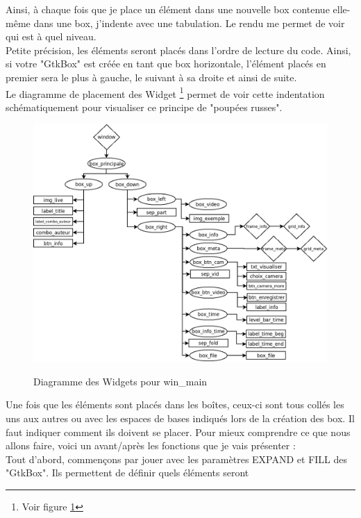\documentclass[11pt,french,a4paper]{report}
\begin{document}
Ainsi, à chaque fois que je place un élément dans une nouvelle box contenue elle-même dans une box, j'indente avec une 
tabulation. Le rendu me permet de voir qui est à quel niveau. \\
Petite précision, les éléments seront placés dans l'ordre de lecture du code. Ainsi, si votre "GtkBox" est créée en tant
que box horizontale, l'élément placés en premier sera le plus à gauche, le suivant à sa droite et ainsi de suite. \\ 
Le diagramme de placement des Widget \footnote{Voir figure \ref{org_win_main}} permet de voir cette 
indentation schématiquement pour visualiser ce principe de "poupées russes".
\begin{figure}[!h]
\centering
\includegraphics[scale=0.5]{../images/dia/diagramme_fenetre.png} \\
        \caption{Diagramme des Widgets pour win\_main}
        \label{org_win_main}
\end{figure}
Une fois que les éléments sont placés dans les boîtes, ceux-ci sont tous collés les uns aux autres ou avec 
les espaces de bases indiqués lors de la création des box. %
Il faut indiquer comment ils doivent se placer. Pour mieux comprendre ce que nous allons faire, voici un 
avant/après les fonctions que je vais présenter : \\ 
Tout d'abord, commençons par jouer avec les paramètres EXPAND et FILL des "GtkBox". Ils permettent de définir quels éléments seront 
\end{document}
